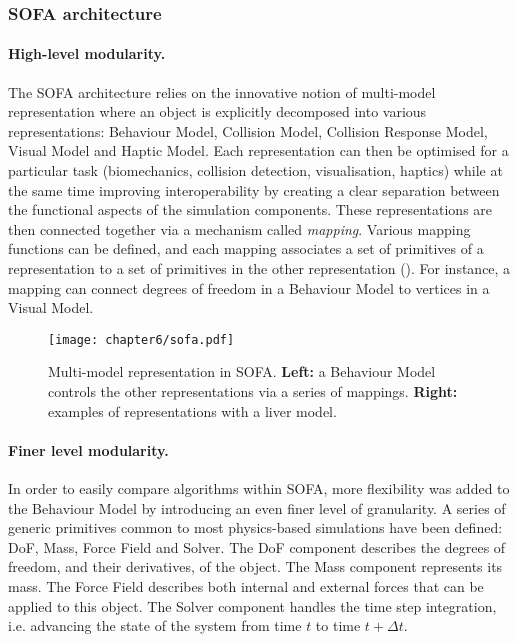 \subsubsection*{SOFA architecture}

\paragraph{High-level modularity.}
The SOFA architecture relies on the innovative notion of multi-model representation where an object is explicitly decomposed into various representations: Behaviour Model, Collision Model, Collision Response Model, Visual Model and Haptic Model. Each representation can then be optimised for a particular task (biomechanics,  collision detection, visualisation, haptics) while at the same time improving interoperability by creating a clear separation between the functional aspects of the simulation components. These representations are then connected together via a mechanism called \emph{mapping}. Various mapping functions can be defined, and each mapping associates a set of primitives of a representation to a set of primitives in the other representation (). For instance, a mapping can connect degrees of freedom in a Behaviour Model to vertices in a Visual Model.

\begin{figure}[ht]
\texttt{[image: chapter6/sofa.pdf]}
\caption [Multi-model representation in SOFA] {Multi-model representation in SOFA. \textbf{Left:} a Behaviour Model controls the other representations via a series of mappings. \textbf{Right:} examples of representations with a liver model.}
\label{chap6:fig-SOFA}
\end{figure}

\paragraph{Finer level modularity.}
In order to easily compare algorithms within SOFA, more flexibility was added to the Behaviour Model by introducing an even finer level of granularity. A series of generic primitives common to most physics-based simulations have been defined: DoF, Mass, Force Field and Solver. The DoF component describes the degrees of freedom, and their derivatives, of the object. The Mass component represents its mass. The Force Field describes both internal and external forces that can be applied to this object. The Solver component handles the time step integration, i.e. advancing the state of the system from time $t$ to time $t+\Delta t$.


